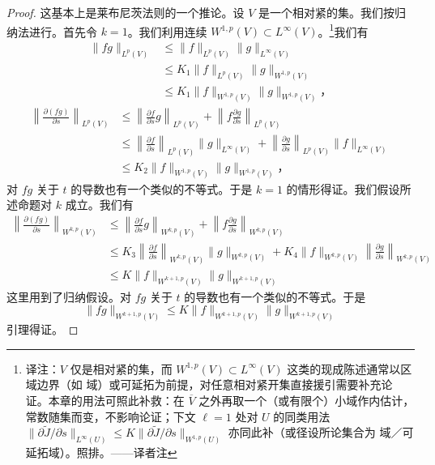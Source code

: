 \begin{proof}
这基本上是莱布尼茨法则的一个推论。设 $V$ 是一个相对紧的\trOpen{}集。我们按归纳法进行。首先令 $k=1$。我们利用连续\trEmbedding{} $W^{1,p}(V)\subset L^{\infty}(V)$。\footnote{译注：$V$ 仅是相对紧的\trOpen{}集，而 $W^{1,p}(V)\subset L^{\infty}(V)$ 这类\trSobolev\trEmbedding{}的现成陈述通常以区域边界\trRegular{}（如 \trLipschitz{}域）或可延拓为前提，对任意相对紧开集直接援引需要补充论证。本章的用法可照此补救：在 $\overline{V}$ 之外再取一个（或有限个）\trSmooth{}小域作内估计，\trEmbedding{}常数随集而变，不影响论证；下文 $\ell=1$ 处对 $U$ 的同类用法 $\bigl\|\partial\widetilde{J}/\partial s\bigr\|_{L^{\infty}(U)}\le K\bigl\|\partial\widetilde{J}/\partial s\bigr\|_{W^{1,p}(U)}$ 亦同此补（或径设所论集合为 \trLipschitz{}域／可延拓域）。照排。——译者注}我们有
\[
\begin{aligned}
\|fg\|_{L^{p}(V)}&\le\|f\|_{L^{p}(V)}\|g\|_{L^{\infty}(V)}\\
&\le K_{1}\|f\|_{L^{p}(V)}\|g\|_{W^{1,p}(V)}\\
&\le K_{1}\|f\|_{W^{1,p}(V)}\|g\|_{W^{1,p}(V)}\text{，}
\end{aligned}
\]
\[
\begin{aligned}
\left\|\frac{\partial(fg)}{\partial s}\right\|_{L^{p}(V)}&\le\left\|\frac{\partial f}{\partial s}g\right\|_{L^{p}(V)}+\left\|f\frac{\partial g}{\partial s}\right\|_{L^{p}(V)}\\
&\le\left\|\frac{\partial f}{\partial s}\right\|_{L^{p}(V)}\|g\|_{L^{\infty}(V)}+\left\|\frac{\partial g}{\partial s}\right\|_{L^{p}(V)}\|f\|_{L^{\infty}(V)}\\
&\le K_{2}\|f\|_{W^{1,p}(V)}\|g\|_{W^{1,p}(V)}\text{，}
\end{aligned}
\]
对 $fg$ 关于 $t$ 的导数也有一个类似的不等式。于是 $k=1$ 的情形得证。我们假设所述命题对 $k$ 成立。我们有
\[
\begin{aligned}
\left\|\frac{\partial(fg)}{\partial s}\right\|_{W^{k,p}(V)}&\le\left\|\frac{\partial f}{\partial s}g\right\|_{W^{k,p}(V)}+\left\|f\frac{\partial g}{\partial s}\right\|_{W^{k,p}(V)}\\
&\le K_{3}\left\|\frac{\partial f}{\partial s}\right\|_{W^{k,p}(V)}\|g\|_{W^{k,p}(V)}+K_{4}\|f\|_{W^{k,p}(V)}\left\|\frac{\partial g}{\partial s}\right\|_{W^{k,p}(V)}\\
&\le K\|f\|_{W^{k+1,p}(V)}\|g\|_{W^{k+1,p}(V)}
\end{aligned}
\]
这里用到了归纳假设。对 $fg$ 关于 $t$ 的导数也有一个类似的不等式。于是
\[
\|fg\|_{W^{k+1,p}(V)}\le K\|f\|_{W^{k+1,p}(V)}\|g\|_{W^{k+1,p}(V)}
\]
引理得证。
\end{proof}

